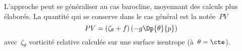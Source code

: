 \sk
L'approche peut se généraliser au cas barocline, 
moyennant des calculs plus élaborés.
La quantité qui se conserve dans le cas général
est la  notée~$PV$
\[
PV = \left( \zeta_{\theta} + f \right) \left( -g \Dp{\theta}{p} \right)
\]
\noindent avec~$\zeta_{\theta}$ vorticité relative
calculée sur une surface isentrope (à~$\theta = \cte$).

